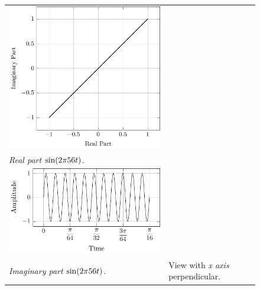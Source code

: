 \documentclass[../../course]{subfiles}
\begin{document}
\begin{figure} [H]
\begin{NiceTabularX} {\textwidth} {
            *{2}{>{\centering\arraybackslash}X}
        }
         {
             {
                \includegraphics[height = \textheight] {tikzpics/plotFrontViewComplexI.pdf}
            }
        }

        \\

         {\emph{Real part} $\sin(2 \pi 56 t)$.}
        \label{plt:realCmplxI}

        &
        \\

         {
             {
                \includegraphics[height = \textheight] {tikzpics/plotShortX3.pdf}
            }
        }

        &
        \\

         {\emph{Imaginary part} $\sin(2 \pi 56 t)$.}
        \label{plt:imagCmplxI}

        &

         {View with \emph{x axis} perpendicular.}
        \label{plt:frontViewCmplxI}

        \\

    \end{NiceTabularX}

\end{figure}
\end{document}

